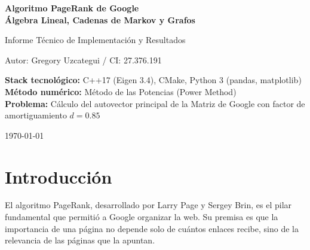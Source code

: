 \documentclass[12pt,a4paper]{article}
\theoremstyle{definition}
\begin{document}
\begin{titlepage}
    \centering
    \vspace*{2cm}
    {\Huge\bfseries Algoritmo PageRank de Google\\[0.3cm] \'Algebra Lineal, Cadenas de Markov y Grafos\par}
    \vspace{1.5cm}
    {\Large Informe T\'{e}cnico de Implementaci\'{o}n y Resultados\par}
    \vspace{2cm}
    {\Large Autor: Gregory Uzcategui / CI: 27.376.191 \par}
    \vspace{2cm}
    {\large
    \textbf{Stack tecnol\'{o}gico:} C++17 (Eigen 3.4), CMake, Python 3 (pandas, matplotlib)\\[0.5cm]
    \textbf{M\'{e}todo num\'{e}rico:} M\'{e}todo de las Potencias (Power Method)\\[0.5cm]
    \textbf{Problema:} C\'{a}lculo del autovector principal de la Matriz de Google con factor de amortiguamiento $d = 0.85$
    \par}
    \vfill
    {\large \today\par}
\end{titlepage}

\begin{abstract}
\noindent
Este informe documenta la implementaci\'{o}n del algoritmo \textbf{PageRank} para determinar la importancia relativa de nodos en un grafo dirigido. Se desarroll\'{o} un solver en C++17 utilizando la librer\'{i}a Eigen para construir la \textbf{Matriz de Google} $G$, incorporando un factor de amortiguamiento $d = 0.85$ para manejar correctamente los nodos sumidero (sin enlaces salientes). El sistema se resolvi\'{o} mediante el \textbf{M\'{e}todo de las Potencias}, iterando $v^{(k+1)} = G v^{(k)}$ hasta alcanzar una tolerancia de $\epsilon = 10^{-8}$. Se evaluaron 5 casos de prueba, incluyendo grafos con sumideros, grafos regulares y grafos complejos.
\end{abstract}

\tableofcontents
\newpage

\section{Introducci\'{o}n}\label{sec:intro}

El algoritmo PageRank, desarrollado por Larry Page y Sergey Brin, es el pilar fundamental que permiti\'{o} a Google organizar la web. Su premisa es que la importancia de una p\'{a}gina no depende solo de cu\'{a}ntos enlaces recibe, sino de la relevancia de las p\'{a}ginas que la apuntan. 
\end{document}
